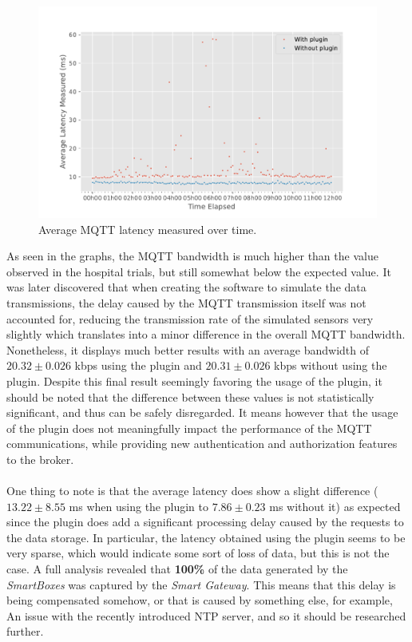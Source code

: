 \begin{figure}[H]
    \centering
    \includegraphics[width=0.85\linewidth]{images/labtest_mqtt_latency.pdf}
    \caption{Average \acs{MQTT} latency measured over time.}
    \label{fig:labtest-mqtt-latency}
\end{figure}

As seen in the graphs, the \acs{MQTT} bandwidth is much higher than the value observed in the hospital trials, but still somewhat below the expected value. It was later discovered that when creating the software to simulate the data transmissions, the delay caused by the \acs{MQTT} transmission itself was not accounted for, reducing the transmission rate of the simulated sensors very slightly which translates into a minor difference in the overall \acs{MQTT} bandwidth. Nonetheless, it displays much better results with an average bandwidth of $20.32 \pm 0.026$ kbps using the plugin and $20.31 \pm 0.026$ kbps without using the plugin. Despite this final result seemingly favoring the usage of the plugin, it should be noted that the difference between these values is not statistically significant, and thus can be safely disregarded. It means however that the usage of the plugin does not meaningfully impact the performance of the \acs{MQTT} communications, while providing new authentication and authorization features to the broker.

\paragraph{} One thing to note is that the average latency does show a slight difference ($13.22 \pm 8.55$ ms when using the plugin to $7.86 \pm 0.23$ ms without it) as expected since the plugin does add a significant processing delay caused by the requests to the data storage. In particular, the latency obtained using the plugin seems to be very sparse, which would indicate some sort of loss of data, but this is not the case. A full analysis revealed that \textbf{100\%} of the data generated by the \textit{SmartBoxes} was captured by the \textit{Smart Gateway}. This means that this delay is being compensated somehow, or that is caused by something else, for example, An issue with the recently introduced \acs{NTP} server, and so it should be researched further.

